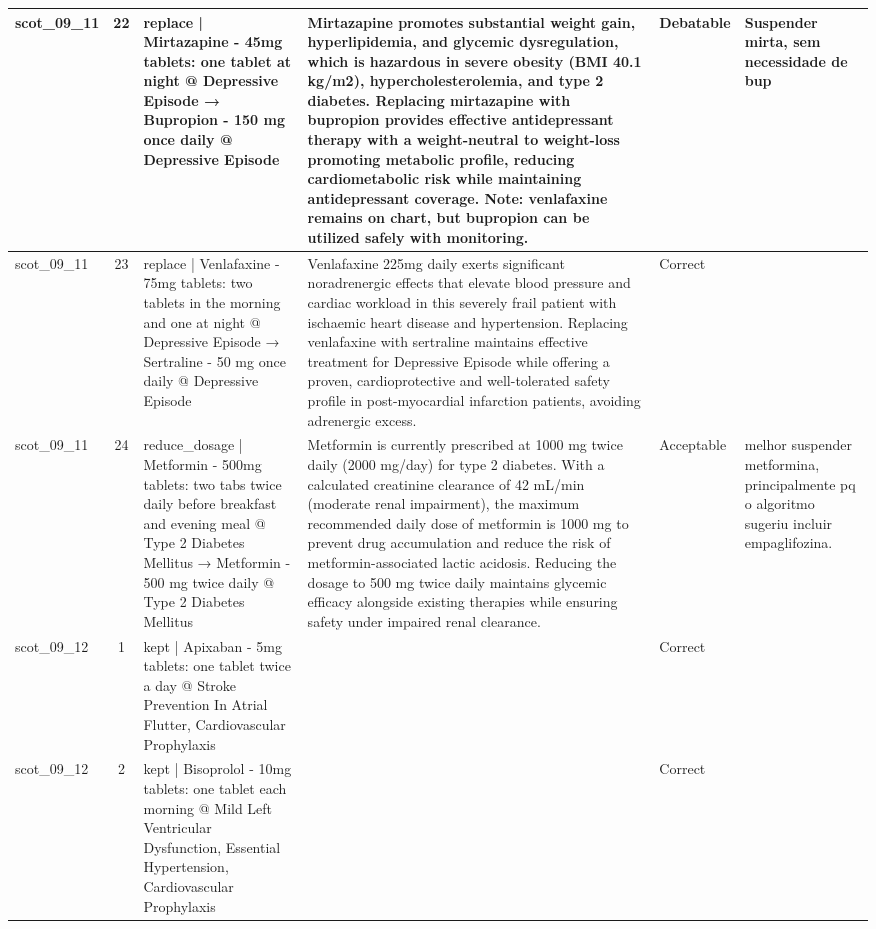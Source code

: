 \begin{longtable}{|p{1.45cm}|c|p{3.3cm}|p{6.5cm}|p{1.55cm}|p{2.3cm}|}
\hline
scot\_09\_11 & 22 & replace | Mirtazapine - 45mg tablets: one tablet at night @ Depressive Episode → Bupropion - 150 mg once daily @ Depressive Episode & Mirtazapine promotes substantial weight gain, hyperlipidemia, and glycemic dysregulation, which is hazardous in severe obesity (BMI 40.1 kg/m2), hypercholesterolemia, and type 2 diabetes. Replacing mirtazapine with bupropion provides effective antidepressant therapy with a weight-neutral to weight-loss promoting metabolic profile, reducing cardiometabolic risk while maintaining antidepressant coverage. Note: venlafaxine remains on chart, but bupropion can be utilized safely with monitoring. & Debatable & Suspender mirta, sem necessidade de bup \\
\hline
scot\_09\_11 & 23 & replace | Venlafaxine - 75mg tablets: two tablets in the morning and one at night @ Depressive Episode → Sertraline - 50 mg once daily @ Depressive Episode & Venlafaxine 225mg daily exerts significant noradrenergic effects that elevate blood pressure and cardiac workload in this severely frail patient with ischaemic heart disease and hypertension. Replacing venlafaxine with sertraline maintains effective treatment for Depressive Episode while offering a proven, cardioprotective and well-tolerated safety profile in post-myocardial infarction patients, avoiding adrenergic excess. & Correct &  \\
\hline
scot\_09\_11 & 24 & reduce\_dosage | Metformin - 500mg tablets: two tabs twice daily before breakfast and evening meal @ Type 2 Diabetes Mellitus → Metformin - 500 mg twice daily @ Type 2 Diabetes Mellitus & Metformin is currently prescribed at 1000 mg twice daily (2000 mg/day) for type 2 diabetes. With a calculated creatinine clearance of 42 mL/min (moderate renal impairment), the maximum recommended daily dose of metformin is 1000 mg to prevent drug accumulation and reduce the risk of metformin-associated lactic acidosis. Reducing the dosage to 500 mg twice daily maintains glycemic efficacy alongside existing therapies while ensuring safety under impaired renal clearance. & Acceptable & melhor suspender metformina, principalmente pq o algoritmo sugeriu incluir empaglifozina. \\
\hline
scot\_09\_12 & 1 & kept | Apixaban - 5mg tablets: one tablet twice a day @ Stroke Prevention In Atrial Flutter, Cardiovascular Prophylaxis &  & Correct &  \\
\hline
scot\_09\_12 & 2 & kept | Bisoprolol - 10mg tablets: one tablet each morning @ Mild Left Ventricular Dysfunction, Essential Hypertension, Cardiovascular Prophylaxis &  & Correct &  \\

\end{longtable}
